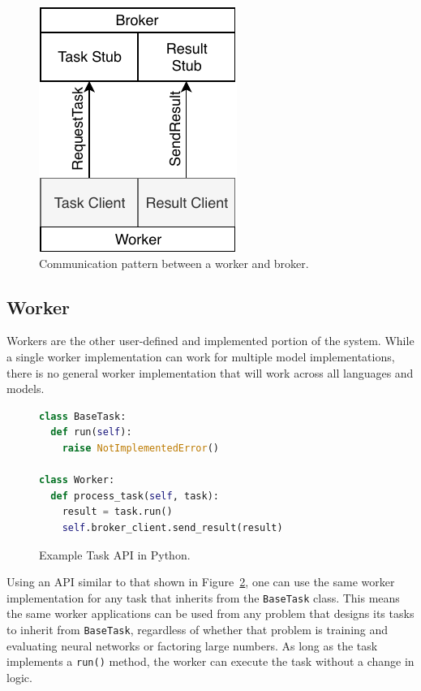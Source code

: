\documentclass[conference]{IEEEtran}
\begin{document}
\begin{figure}
  \centering
  \includegraphics{img/broker_worker}
  \caption{Communication pattern between a worker and broker.}
  \label{fig:worker-broker}
\end{figure}

\subsection{Worker}
Workers are the other user-defined and implemented portion of the system. While
a single worker implementation can work for multiple model implementations,
there is no general worker implementation that will work across all languages
and models.

\begin{figure}
  \begin{lstlisting}[language=python]
class BaseTask:
  def run(self):
    raise NotImplementedError()

class Worker:
  def process_task(self, task):
    result = task.run()
    self.broker_client.send_result(result)
  \end{lstlisting}
  \caption{Example Task API in Python.}\label{fig:python-api}
\end{figure}

Using an API similar to that shown in Figure~\ref{fig:python-api}, one can use
the same worker implementation for any task that inherits from the
\texttt{BaseTask} class. This means the same worker applications can be used
from any problem that designs its tasks to inherit from \texttt{BaseTask},
regardless of whether that problem is training and evaluating neural networks
or factoring large numbers. As long as the task implements a \texttt{run()} method,
the worker can execute the task without a change in logic.
\end{document}
